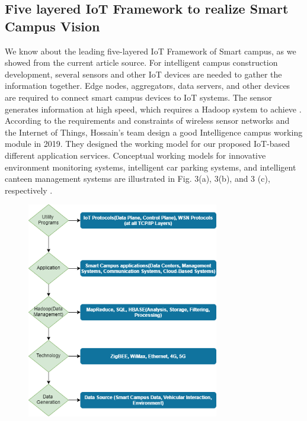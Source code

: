 \documentclass[conference]{IEEEtran}
\begin{document}
\subsection{Five  layered  IoT  Framework  to  realize  Smart  Campus Vision}


We know about the leading five-layered IoT Framework of Smart campus, as we showed from the current article source. For intelligent campus construction development, several sensors and other IoT devices are needed to gather the information together. Edge nodes, aggregators, data servers, and other devices are required to connect smart campus devices to IoT systems. The sensor generates information at high speed, which requires a Hadoop system to achieve \cite{INTCAMPUS:ANovelFrame}. According to the requirements and constraints of wireless sensor networks and the Internet of Things, Hossain's team design a good Intelligence campus working module in 2019. They designed the working model for our proposed IoT-based different application services. Conceptual working models for innovative environment monitoring systems, intelligent car parking systems, and intelligent canteen management systems are illustrated in Fig. 3(a), 3(b), and 3 (c), respectively \cite{INTCAMPUS:FlexibleTech}. 

\begin{figure} %
    
    \includegraphics[width=8.4cm, height=12cm\textwidth]{bibliography/images/diagram1new.png}
\end{figure}
\end{document}

